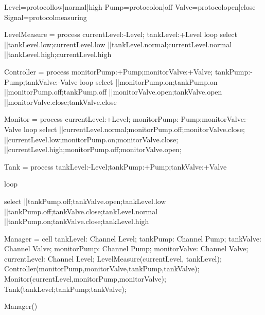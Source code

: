 \begin{code}

Level=protocol{low|normal|high}
Pump=protocol{on|off}
Valve=protocol{open|close}
Signal=protocol{measuring}

LevelMeasure = process  currentLevel:-Level; tankLevel:+Level
{
    loop
    {
        select
        {
            ||tankLevel.low;currentLevel.low
            ||tankLevel.normal;currentLevel.normal
            ||tankLevel.high;currentLevel.high
        }
    }
}

Controller = process monitorPump:+Pump;monitorValve:+Valve; tankPump:-Pump;tankValve:-Valve
{
    loop
    {
        select
        {
            ||monitorPump.on;tankPump.on
            ||monitorPump.off;tankPump.off
            ||monitorValve.open;tankValve.open
            ||monitorValve.close;tankValve.close
        }
    }
}

Monitor = process currentLevel:+Level; monitorPump:-Pump;monitorValve:-Valve
{
    loop
    {
        select
        {
            ||currentLevel.normal;monitorPump.off;monitorValve.close;
            ||currentLevel.low;monitorPump.on;monitorValve.close;
            ||currentLevel.high;monitorPump.off;monitorValve.open;
        }
    }
}

Tank = process tankLevel:-Level;tankPump:+Pump;tankValve:+Valve
{
    loop
    {
        select
        {
            ||tankPump.off;tankValve.open;tankLevel.low
            ||tankPump.off;tankValve.close;tankLevel.normal
            ||tankPump.on;tankValve.close;tankLevel.high
        }
      
    }
    
}

Manager = cell
{
    tankLevel: Channel Level;
    tankPump: Channel Pump;
    tankValve: Channel Valve;
    monitorPump: Channel Pump;
    monitorValve: Channel Valve;
    currentLevel: Channel Level;
    LevelMeasure(currentLevel, tankLevel);
    Controller(monitorPump,monitorValve,tankPump,tankValve);
    Monitor(currentLevel,monitorPump,monitorValve);
    Tank(tankLevel;tankPump;tankValve);
}

Manager()
\end{code}